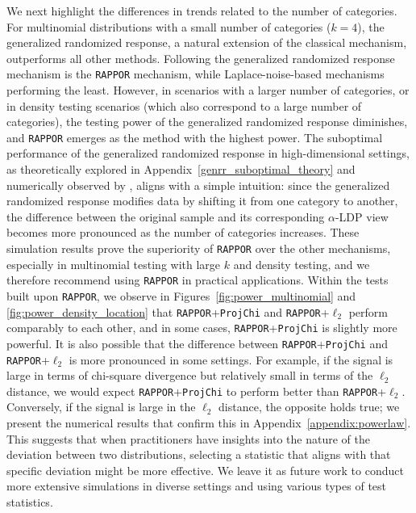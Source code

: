 \documentclass[twoside,11pt]{article}
\newcommand{\alphabetSize}{k} %
\newcommand{\privacyParameter}{\alpha} %
\begin{document}
\begin{itemize}
We next highlight the differences in trends related to the number of categories. For multinomial distributions with a small number of categories (\(\alphabetSize=4\)), the generalized randomized response, a natural extension of the classical mechanism, outperforms all other methods. Following the generalized randomized response mechanism is the \texttt{RAPPOR} mechanism, while Laplace-noise-based mechanisms performing the least. However, in scenarios with a larger number of categories, or in density testing scenarios (which also correspond to a large number of categories), the testing power of the generalized randomized response diminishes, and \texttt{RAPPOR} emerges as the method with the highest power. The suboptimal performance of the generalized randomized response in high-dimensional settings, as theoretically explored in Appendix~\ref{genrr_suboptimal_theory} and numerically observed by \citet{Gaboardi2018LDPChisq}, aligns with a simple intuition: since the generalized randomized response modifies data by shifting it from one category to another, the difference between the original sample and its corresponding $\privacyParameter$-LDP view becomes more pronounced as the number of categories increases. These simulation results prove the superiority of \texttt{RAPPOR} over the other mechanisms, especially in multinomial testing with large $k$ and density testing, and we therefore recommend using \texttt{RAPPOR} in practical applications. 
Within the tests built upon \texttt{RAPPOR}, we observe in Figures~\ref{fig:power_multinomial} and \ref{fig:power_density_location}  that \texttt{RAPPOR}+\texttt{ProjChi} and \texttt{RAPPOR}+$\ell_2$ perform comparably to each other, and in some cases, \texttt{RAPPOR}+\texttt{ProjChi} is slightly more powerful. 
It is also possible that the difference between \texttt{RAPPOR}+\texttt{ProjChi} and \texttt{RAPPOR}+$\ell_2$ is more pronounced in some settings. For example, if the signal is large in terms of chi-square divergence but relatively small in terms of the $\ell_2$ distance, we would expect \texttt{RAPPOR}+\texttt{ProjChi} to perform better than \texttt{RAPPOR}+$\ell_2$. Conversely, if the signal is large in the $\ell_2$ distance, the opposite holds true;
we present the numerical results that confirm this in Appendix~\ref{appendix:powerlaw}.
This suggests that when practitioners have insights into the nature of the deviation between two distributions, selecting a statistic that aligns with that specific deviation might be more effective. We leave it as future work to conduct more extensive simulations in diverse settings and using various types of test statistics.
\end{itemize}
\end{document}
